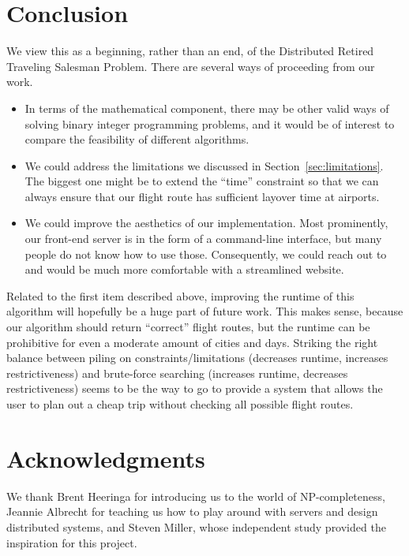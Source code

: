 \documentclass{article}
\begin{document}
\section{Conclusion}\label{sec:conclusion}

We view this as a beginning, rather than an end, of the Distributed Retired Traveling Salesman Problem. There are several ways of proceeding from our
work.

\begin{itemize}[noitemsep]
    \item In terms of the mathematical component, there may be other valid ways of solving binary integer programming problems, and it would be of
    interest to compare the feasibility of different algorithms.
    \item We could address the limitations we discussed in Section~\ref{sec:limitations}. The biggest one might be to extend the ``time'' constraint
    so that we can always ensure that our flight route has sufficient layover time at airports.
    \item We could improve the aesthetics of our implementation. Most prominently, our front-end server is in the form of a command-line interface,
    but many people do not know how to use those. Consequently, we could reach out to and would be much more comfortable with a streamlined website.
\end{itemize}

Related to the first item described above, improving the runtime of this algorithm will hopefully be a huge part of future work. This makes sense,
because our algorithm should return ``correct'' flight routes, but the runtime can be prohibitive for even a moderate amount of cities and days.
Striking the right balance between piling on constraints/limitations (decreases runtime, increases restrictiveness) and brute-force searching
(increases runtime, decreases restrictiveness) seems to be the way to go to provide a system that allows the user to plan out a cheap trip without
checking all possible flight routes.

\section*{Acknowledgments}
 
We thank Brent Heeringa for introducing us to the world of NP-completeness, Jeannie Albrecht for teaching us how to play around with servers and
design distributed systems, and Steven Miller, whose independent study provided the inspiration for this project.
\end{document}
